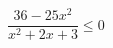 \begin{ex}[type=inequality]
	\begin{condition}
		\( \dfrac{36-25x^2}{x^2+2x+3}\le0 \)
	\end{condition}
\end{ex}